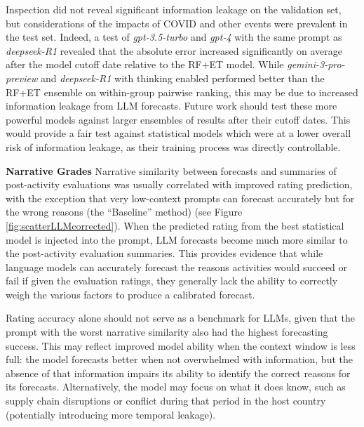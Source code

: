 \documentclass[12pt,a4paper]{article}
\begin{document}
Inspection did not reveal significant information leakage on the validation set, but considerations of the impacts of COVID and other events were prevalent in the test set. Indeed, a test of \emph{gpt-3.5-turbo} and \emph{gpt-4} with the same prompt as \emph{deepseek-R1} revealed that the absolute error increased significantly on average after the model cutoff date relative to the RF+ET model. While \emph{gemini-3-pro-preview} and \emph{deepseek-R1} with thinking enabled performed better than the RF+ET ensemble on within-group pairwise ranking, this may be due to increased information leakage from LLM forecasts. Future work should test these more powerful models against larger ensembles of results after their cutoff dates. This would provide a fair test against statistical models which were at a lower overall risk of information leakage, as their training process was directly controllable.

\textbf{Narrative Grades}
Narrative similarity between forecasts and summaries of post-activity evaluations was usually correlated with improved rating prediction, with the exception that very low-context prompts can forecast accurately but for the wrong reasons (the ``Baseline'' method) (see Figure \ref{fig:scatterLLMcorrected}). When the predicted rating from the best statistical model is injected into the prompt, LLM forecasts become much more similar to the post-activity evaluation summaries. This provides evidence that while language models can accurately forecast the reasons activities would succeed or fail if given the evaluation ratings, they generally lack the ability to correctly weigh the various factors to produce a calibrated forecast.

Rating accuracy alone should not serve as a benchmark for LLMs, given that the prompt with the worst narrative similarity also had the highest forecasting success. This may reflect improved model ability when the context window is less full: the model forecasts better when not overwhelmed with information, but the absence of that information impairs its ability to identify the correct reasons for its forecasts. Alternatively, the model may focus on what it does know, such as supply chain disruptions or conflict during that period in the host country (potentially introducing more temporal leakage).
\end{document}
